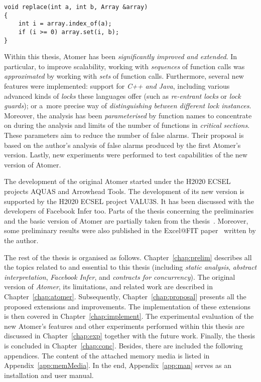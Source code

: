\begin{lstlisting}[style=c++, label={list:exampleViolation}, float=hbt, caption={An example of \emph{atomicity violation}}]
void replace(int a, int b, Array &array) 
{
    int i = array.index_of(a);
    if (i >= 0) array.set(i, b);
}
\end{lstlisting}

Within this thesis, Atomer has been \emph{significantly improved and extended}. In particular, to improve scalability, working with \emph{sequences} of function calls was \emph{approximated} by working with \emph{sets} of function calls. Furthermore, several new features were implemented: support for \emph{C++ and Java}, including various advanced kinds of \emph{locks} these languages offer (such as \emph{re-entrant locks} or \emph{lock guards}); or a~more precise way of \emph{distinguishing between different lock instances}. Moreover, the analysis has been \emph{parameterised} by function names to concentrate on during the analysis and limits of the number of functions in \emph{critical sections}. These parameters aim to reduce the number of false alarms. Their proposal is based on the author's analysis of false alarms produced by the first Atomer's version. Lastly, new experiments were performed to test capabilities of the new version of Atomer.

The development of the original Atomer started under the H2020 ECSEL projects AQUAS and Arrowhead Tools. The development of its new version is supported by the H2020 ECSEL project VALU3S. It has been discussed with the developers of Facebook Infer too. Parts of the thesis concerning the preliminaries and the basic version of Atomer are partially taken from the thesis~\cite{harmimBP}. Moreover, some preliminary results were also published in the Excel@FIT paper~\cite{excel2021Harmim} written by the author.

The rest of the thesis is organised as follows. Chapter~\ref{chap:prelim} describes all the topics related to and essential to this thesis (including \emph{static analysis}, \emph{abstract interpretation}, \emph{Facebook Infer}, and \emph{contracts for concurrency}). The original version of \emph{Atomer}, its limitations, and related work are described in Chapter~\ref{chap:atomer}. Subsequently, Chapter~\ref{chap:proposal} presents all the proposed extensions and improvements. The implementation of these extensions is then covered in Chapter~\ref{chap:implement}. The experimental evaluation of the new Atomer's features and other experiments performed within this thesis are discussed in Chapter~\ref{chap:exp} together with the future work. Finally, the thesis is concluded in Chapter~\ref{chap:conc}. Besides, there are included the following appendices. The content of the attached memory media is listed in Appendix~\ref{app:memMedia}. In the end, Appendix~\ref{app:man} serves as an installation and user manual.



